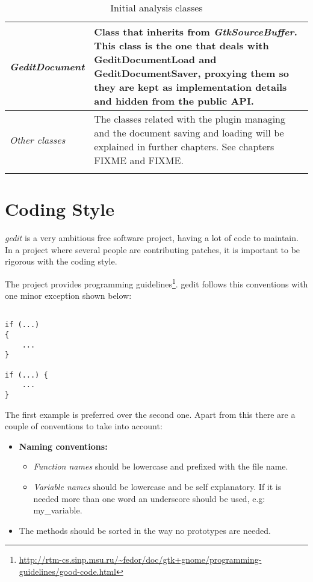 \begin{table}[H]
\begin{center}
\begin{tabularx}{\textwidth}{|l|X|}
      \hline
      \textit{GeditDocument} & Class that inherits from \emph{GtkSourceBuffer}. This class is the one that deals with GeditDocumentLoad and GeditDocumentSaver, proxying them so they are kept as implementation details and hidden from the public API. \\
      \hline
      \textit{Other classes} & The classes related with the plugin managing and the document saving and loading will be explained in further chapters. See chapters FIXME and FIXME. \\
      \lasthline
    \end{tabularx}
    \caption{Initial analysis classes}
  \end{center}
\end{table}

\newpage
\section{Coding Style}\label{sec:CodingStyle}

\emph{gedit} is a very ambitious free software project, having a lot of code to maintain. In a project where several people are contributing patches, it is important to be rigorous with the coding style.

The \GNOME project provides programming guidelines\footnote{\url{http://rtm-cs.sinp.msu.ru/~fedor/doc/gtk+gnome/programming-guidelines/good-code.html}}. gedit follows this conventions with one minor exception shown below:
\begin{lstlisting}[style=GObject]

if (...)
{
	...
}

if (...) {
	...
}

\end{lstlisting}

The first example is preferred over the second one. Apart from this there are a couple of conventions to take into account:
\begin{itemize}
  \item \textbf{Naming conventions:}
    \begin{itemize}
      \item \emph{Function names} should be lowercase and prefixed with the file name.
      \item \emph{Variable names} should be lowercase and be self explanatory. If it is needed more than one word an underscore should be used, e.g:  my\_variable.
    \end{itemize}
  \item The methods should be sorted in the way no prototypes are needed.
\end{itemize}

